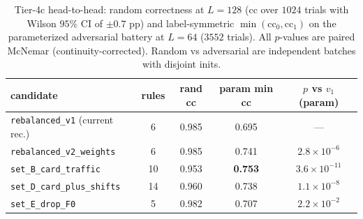 \documentclass[11pt,a4paper]{article}
\begin{document}
\begin{table}[h]\centering\small
\begin{tabular}{l c c c c}
\toprule
candidate & rules & rand cc & param min cc & \(p\) vs \(v_1\) (param) \\
\midrule
\texttt{rebalanced\_v1} (current rec.) & 6 & 0.985 & 0.695 & --- \\
\texttt{rebalanced\_v2\_weights} & 6 & 0.985 & 0.741 & \(2.8 \times 10^{-6}\) \\
\texttt{set\_B\_card\_traffic} & 10 & 0.953 & \textbf{0.753} & \(3.6 \times 10^{-11}\) \\
\texttt{set\_D\_card\_plus\_shifts} & 14 & 0.960 & 0.738 & \(1.1 \times 10^{-8}\) \\
\texttt{set\_E\_drop\_F0} & 5 & 0.982 & 0.707 & \(2.2 \times 10^{-2}\) \\
\bottomrule
\end{tabular}
\caption{Tier-4c head-to-head: random correctness at \(L=128\)
(\(\mathrm{cc}\) over \(1024\) trials with Wilson \(95\%\) CI of
\(\pm 0.7\) pp) and label-symmetric
\(\min(\mathrm{cc}_0, \mathrm{cc}_1)\) on the parameterized
adversarial battery at \(L=64\) (\(3552\) trials).  All
\(p\)-values are paired McNemar (continuity-corrected).  Random vs
adversarial are independent batches with disjoint inits.}
\label{tab:tier-4c}
\end{table}
\end{document}
